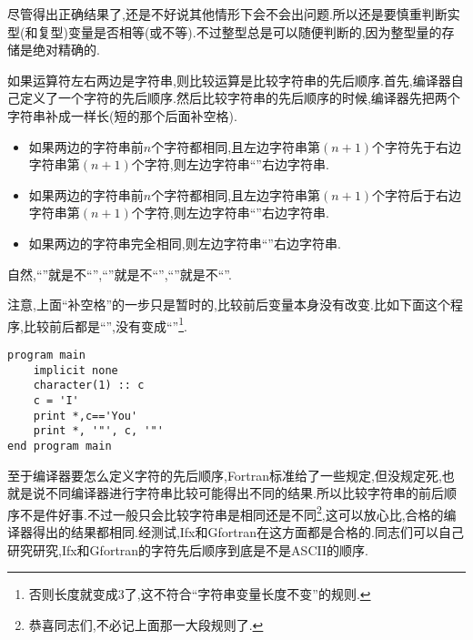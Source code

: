 尽管得出正确结果了,还是不好说其他情形下会不会出问题.所以还是要慎重判断实型(和复型)变量是否相等(或不等).不过整型总是可以随便判断的,因为整型量的存储是绝对精确的.

如果运算符左右两边是字符串,则比较运算是比较字符串的先后顺序.首先,编译器自己定义了一个字符的先后顺序.然后比较字符串的先后顺序的时候,编译器先把两个字符串补成一样长(短的那个后面补空格).
\begin{itemize}
    \item 如果两边的字符串前$n$个字符都相同,且左边字符串第$(n+1)$个字符先于右边字符串第$(n+1)$个字符,则左边字符串``\ttt{<}''右边字符串.
    \item 如果两边的字符串前$n$个字符都相同,且左边字符串第$(n+1)$个字符后于右边字符串第$(n+1)$个字符,则左边字符串``\ttt{>}''右边字符串.
    \item 如果两边的字符串完全相同,则左边字符串``\ttt{==}''右边字符串.
\end{itemize}
自然,``\ttt{>=}''就是不``\ttt{<}'',``\ttt{<=}''就是不``\ttt{>}'',``\ttt{/=}''就是不``\ttt{==}''.

注意,上面``补空格''的一步只是暂时的,比较前后变量本身没有改变.比如下面这个程序,比较前后都是``'',没有变成``''\footnote{
否则长度就变成3了,这不符合``字符串变量长度不变''的规则.
}.
\begin{lstlisting}
program main
    implicit none
    character(1) :: c
    c = 'I'
    print *,c=='You'
    print *, '"', c, '"'
end program main
\end{lstlisting}

至于编译器要怎么定义字符的先后顺序,Fortran标准给了一些规定,但没规定死,也就是说不同编译器进行字符串比较可能得出不同的结果.所以比较字符串的前后顺序不是件好事.不过一般只会比较字符串是相同还是不同\footnote{
    恭喜同志们,不必记上面那一大段规则了.
},这可以放心比,合格的编译器得出的结果都相同.经测试,Ifx和Gfortran在这方面都是合格的.同志们可以自己研究研究,Ifx和Gfortran的字符先后顺序到底是不是ASCII的顺序.
